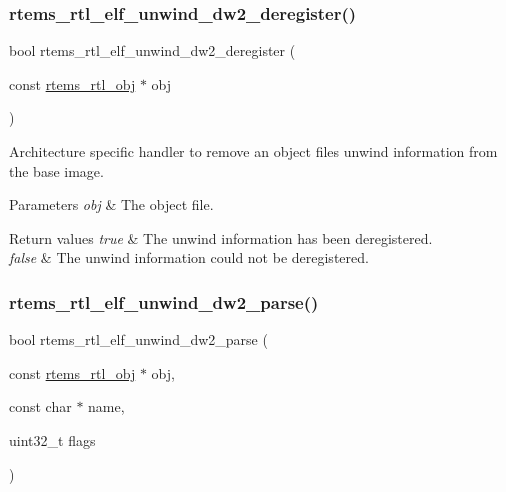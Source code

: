 \subsubsection{\texorpdfstring{rtems\_rtl\_elf\_unwind\_dw2\_deregister()}{rtems\_rtl\_elf\_unwind\_dw2\_deregister()}}
{\footnotesize\ttfamily bool rtems\+\_\+rtl\+\_\+elf\+\_\+unwind\+\_\+dw2\+\_\+deregister (\begin{DoxyParamCaption}\item[{const \mbox{\hyperlink{structrtems__rtl__obj}{rtems\+\_\+rtl\+\_\+obj}} $\ast$}]{obj }\end{DoxyParamCaption})}

Architecture specific handler to remove an object file\textquotesingle{}s unwind information from the base image.


\begin{DoxyParams}{Parameters}
{\em obj} & The object file. \\
\hline
\end{DoxyParams}

\begin{DoxyRetVals}{Return values}
{\em true} & The unwind information has been deregistered. \\
\hline
{\em false} & The unwind information could not be deregistered. \\
\hline
\end{DoxyRetVals}
\mbox{\label{rtl-unwind-dw2_8h_a0c7193498e6ee5edea31888a8a904950}} 
\subsubsection{\texorpdfstring{rtems\_rtl\_elf\_unwind\_dw2\_parse()}{rtems\_rtl\_elf\_unwind\_dw2\_parse()}}
{\footnotesize\ttfamily bool rtems\+\_\+rtl\+\_\+elf\+\_\+unwind\+\_\+dw2\+\_\+parse (\begin{DoxyParamCaption}\item[{const \mbox{\hyperlink{structrtems__rtl__obj}{rtems\+\_\+rtl\+\_\+obj}} $\ast$}]{obj,  }\item[{const char $\ast$}]{name,  }\item[{uint32\+\_\+t}]{flags }\end{DoxyParamCaption})}

